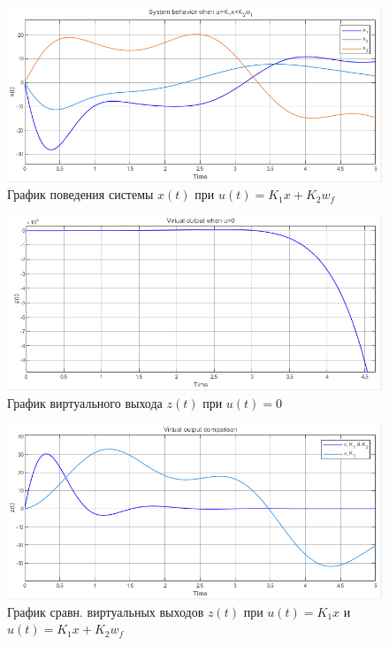 \documentclass[a4paper, 12pt]{article}
\begin{document}
    \begin{figure}[H]
        \centering
        \includegraphics[scale=0.75]{1task_ukk_x.png}
        \captionsetup{skip=0pt}
        \caption{График поведения системы $x(t)$ при $u(t)=K_1x+K_2 w_f$}
        \label{fig:1task_ukk_x}
    \end{figure}
    \begin{figure}[H]
        \centering
        \includegraphics[scale=0.75]{1task_unull_z.png}
        \captionsetup{skip=0pt}
        \caption{График виртуального выхода $z(t)$ при $u(t)=0$}
        \label{fig:1task_unull_z}
    \end{figure}
    \begin{figure}[H]
        \centering
        \includegraphics[scale=0.75]{1task_zz.png}
        \captionsetup{skip=0pt}
        \caption{График сравн. виртуальных выходов $z(t)$ при $u(t)=K_1x$ и $u(t)=K_1x+K_2 w_f$}
        \label{fig:1task_zz}
    \end{figure}
\end{document}
